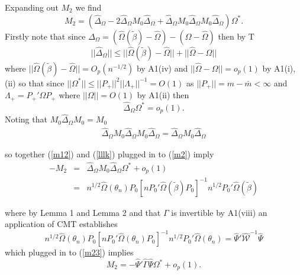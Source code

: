 \documentclass[11pt, fleqn]{article}
\begin{document}
 Expanding out $M_2$ we find
 \begin{equation} \label{m2}M_2= (\hat{\Delta}_{\Omega} -2\hat{\Delta}_{\Omega}M_0\hat{\Delta}_{\Omega} +
 \hat{\Delta}_{\Omega}M_0\hat{\Delta}_{\Omega}M_0\hat{\Delta}_{\Omega})\Omega^*. \end{equation}
 Firstly note that since $\hat{\Delta}_{\Omega}=(\hat{\Omega}(\tilde{\beta})-\hat{\Omega})-(\Omega-\hat{\Omega})$ then by T
 \begin{equation} |\!|\hat{\Delta}_{\Omega}|\!|\leq |\!|\hat{\Omega}(\tilde{\beta})-\hat{\Omega}|\!|
 +|\!|\hat{\Omega}-\Omega|\!| \end{equation}
 where $ |\!|\hat{\Omega}(\tilde{\beta})-\hat{\Omega}|\!|=O_p(n^{-1/2})$ by A1(iv) and $|\!|\hat{\Omega}-\Omega|\!|=o_p(1)$ by A1(i),(ii) so that since $|\!|\Omega^*|\!|\leq |\!|P_+|\!|^2|\!|\Lambda_+|\!|^{-1}=O(1)$ as $|\!|P_+|\!|=m-\bar{m}<\infty$ and $\Lambda_+=P_+'\Omega P_+$ where $|\!|\Omega|\!|=O(1)$ by A1(ii) then
 \begin{equation} \label{lllk}  \hat{\Delta}_{\Omega}\Omega^* =o_p(1). \end{equation}
 Noting that $M_0\hat{\Delta}_{\Omega}M_0=M_0$
 \begin{align}  \hat{\Delta}_{\Omega}M_0\hat{\Delta}_{\Omega}M_0\hat{\Delta}_{\Omega}= \hat{\Delta}_{\Omega}M_0\hat{\Delta}_{\Omega} \label{m12} \end{align}
 
 
 so together (\ref{m12}) and (\ref{lllk}) plugged in to (\ref{m2}) imply
 \begin{eqnarray} \label{m23} -M_2&=& \hat{\Delta}_{\Omega}M_0\hat{\Delta}_{\Omega}\Omega^*+o_p(1) \\	&=& n^{1/2}\hat{\Omega}(\theta_n)P_0[nP_0'\hat{\Omega}(\tilde{\beta})P_0]^{-1}n^{1/2}P_0'\hat{\Omega}(\tilde{\beta})\end{eqnarray}
 


 where by Lemma 1 and Lemma 2 and that $\Gamma$ is invertible by A1(viii) an application of CMT establishes
 \begin{equation} \label{m11} n^{1/2}\hat{\Omega}(\theta_n)P_0[nP_0'\hat{\Omega}(\theta_n)P_0]^{-1}n^{1/2}P_0'\hat{\Omega}(\theta_n)=
 \hat{\Psi}'\hat{\mathcal{W}}^{-1}\hat{\Psi} \end{equation}
 which plugged in to (\ref{m23}) implies
 \begin{equation} \label{m22} M_2=-\hat{\Psi}'\hat{\Gamma}\hat{\Psi}\Omega^* +o_p(1). \end{equation}
 
\end{document}
